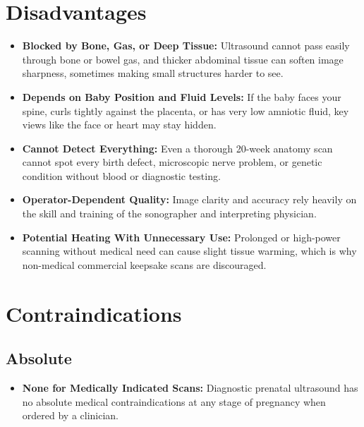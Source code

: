 \section{Disadvantages}
\begin{itemize}
\item \textbf{Blocked by Bone, Gas, or Deep Tissue:} Ultrasound cannot pass easily through bone or bowel gas, and thicker abdominal tissue can soften image sharpness, sometimes making small structures harder to see.
\item \textbf{Depends on Baby Position and Fluid Levels:} If the baby faces your spine, curls tightly against the placenta, or has very low amniotic fluid, key views like the face or heart may stay hidden.
\item \textbf{Cannot Detect Everything:} Even a thorough 20-week anatomy scan cannot spot every birth defect, microscopic nerve problem, or genetic condition without blood or diagnostic testing.
\item \textbf{Operator-Dependent Quality:} Image clarity and accuracy rely heavily on the skill and training of the sonographer and interpreting physician.
\item \textbf{Potential Heating With Unnecessary Use:} Prolonged or high-power scanning without medical need can cause slight tissue warming, which is why non-medical commercial keepsake scans are discouraged.
\end{itemize}

\section{Contraindications}

\subsection{Absolute}
\begin{itemize}
\item \textbf{None for Medically Indicated Scans:} Diagnostic prenatal ultrasound has no absolute medical contraindications at any stage of pregnancy when ordered by a clinician.
\end{itemize}

